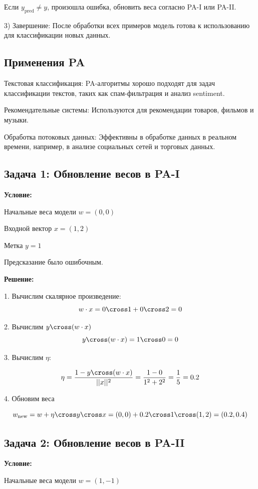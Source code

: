 \begin{itemize}
Если $y_{\text{pred}} \ne y$, произошла ошибка, обновить веса согласно PA-I или PA-II.

3) Завершение: После обработки всех примеров модель готова к использованию для классификации новых данных.

\subsection*{Применения PA}

Текстовая классификация: PA-алгоритмы хорошо подходят для задач классификации текстов, таких как спам-фильтрация и анализ sentiment.

Рекомендательные системы: Используются для рекомендации товаров, фильмов и музыки.

Обработка потоковых данных: Эффективны в обработке данных в реальном времени, например, в анализе социальных сетей и торговых данных.


\subsection*{Задача 1: Обновление весов в PA-I}

\textbf{Условие:}  

Начальные веса модели $w = (0, 0)$

Входной вектор $x = (1, 2)$

Метка $y = 1$

Предсказание было ошибочным.

\textbf{Решение:}

1. Вычислим скалярное произведение:
\[
    w \cdot x = 0 \cross 1 + 0 \cross 2 = 0
\]


2. Вычислим $y \cross (w \cdot x)$
\[
y \cross (w \cdot x) = 1 \cross 0 = 0
\]

3. Вычислим $\eta$:

\[
    \eta = \frac{1 - y\cross(w \cdot x)}{||x||^2} = \frac{1 - 0}{1^2 + 2^2} = \frac{1}{5} = 0.2
\]

4. Обновим веса

\[
    w_{\text{new}} = w + \eta \cross y \cross x = (0, 0) + 0.2 \cross 1 \cross (1, 2)  = (0.2, 0.4)
\]

\subsection*{Задача 2: Обновление весов в PA-II}

\textbf{Условие:}

Начальные веса модели $w = (1, -1)$


\end{itemize}
